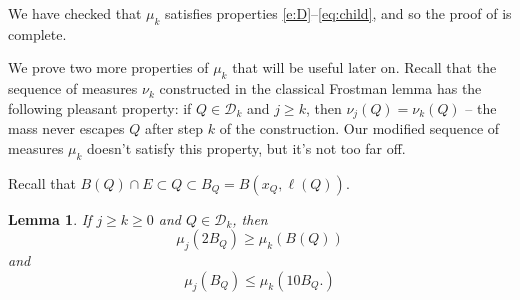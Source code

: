 \documentclass[11pt,reqno]{amsart}
\newtheorem{lemma}[theorem]{Lemma}
\theoremstyle{definition}
\theoremstyle{remark}
\numberwithin{equation}{section}
\newcommand{\DD}{\mathcal{D}}
\theoremstyle{theorem}
\theoremstyle{definition}
\theoremstyle{remark}
\numberwithin{equation}{section}
\begin{document}
We have checked that $\mu_k$ satisfies properties \eqref{e:D}--\eqref{eq:child}, and so the proof of  is complete.

We prove two more properties of $\mu_k$ that will be useful later on. Recall that the sequence of measures $\nu_k$ constructed in the classical Frostman lemma has the following pleasant property: if $Q\in\DD_k$ and $j\ge k$, then $\nu_j(Q)=\nu_k(Q)$ -- the mass never escapes $Q$ after step $k$ of the construction. Our modified sequence of measures $\mu_k$ doesn't satisfy this property, but it's not too far off. 

Recall that $B(Q)\cap E\subset Q\subset B_Q=B(x_Q,\ell(Q))$.
\begin{lemma}\label{lem:massstays}
	If $j\ge k\ge 0$ and $Q\in\DD_k$, then
	\begin{equation}\label{eq:massstays}
	\mu_j(2B_Q)\ge \mu_k(B(Q))
	\end{equation}
	and
	\begin{equation}\label{eq:massstays2}
	\mu_j(B_Q)\le \mu_k(10B_Q.)
	\end{equation}
\end{lemma}
\end{document}
